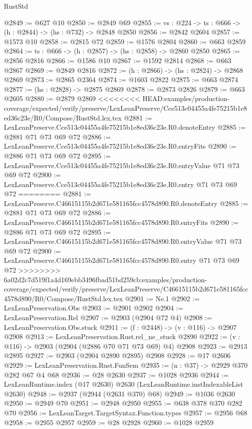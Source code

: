 \begin{lexlean}{RustStd}
\begin{coremodule}
{\begin{coremodule}
{{{{{{{@2849 := @627 @10
@2850 := @2849 @69
@2855 := {vs : @224} -> {ts : @666} -> (h : @2844) -> (hs : @732) -> @2848 @2850
@2856 := @2842 @2604
@2857 := @1573 @10
@2858 := @2815 @72
@2859 := @1576 @2804
@2860 := @663 @2859
@2864 := {ts : @666} -> (h : @2857) -> (hs : @2858) -> @2860 @2850
@2865 := @2856 @2816
@2866 := @1586 @10
@2867 := @1592 @2814
@2868 := @663 @2867
@2869 := @2849 @2816
@2872 := (h : @2866) -> (hs : @2824) -> @2868 @2869
@2873 := @2865 @2364
@2874 := @1603 @2822
@2875 := @663 @2874
@2877 := (hs : @2828) -> @2875 @2869
@2878 := @2873 @2826
@2879 := @663 @2605
@2880 := @2879 @2869
<<<<<<<< HEAD:examples/production-coverage/expected/verify/preserve/LexLeanPreserve/Cce513c04455a4fe75215b1e8ed36c23e/R0/Compose/RustStd.lex.tex
@2881 := LexLeanPreserve.Cce513c04455a4fe75215b1e8ed36c23e.R0.denoteEntry
@2885 := @2881 @71 @73 @69 @72
@2886 := LexLeanPreserve.Cce513c04455a4fe75215b1e8ed36c23e.R0.entryFits
@2890 := @2886 @71 @73 @69 @72
@2895 := LexLeanPreserve.Cce513c04455a4fe75215b1e8ed36c23e.R0.entryValue @71 @73 @69 @72
@2900 := LexLeanPreserve.Cce513c04455a4fe75215b1e8ed36c23e.R0.entry @71 @73 @69 @72
========
@2881 := LexLeanPreserve.C46615115b2d671e581165fcc4578d890.R0.denoteEntry
@2885 := @2881 @71 @73 @69 @72
@2886 := LexLeanPreserve.C46615115b2d671e581165fcc4578d890.R0.entryFits
@2890 := @2886 @71 @73 @69 @72
@2895 := LexLeanPreserve.C46615115b2d671e581165fcc4578d890.R0.entryValue @71 @73 @69 @72
@2900 := LexLeanPreserve.C46615115b2d671e581165fcc4578d890.R0.entry @71 @73 @69 @72
>>>>>>>> 6a02d2c7d519f1a4d169ebb3496fbad51bd259cb:examples/production-coverage/expected/verify/preserve/LexLeanPreserve/C46615115b2d671e581165fcc4578d890/R0/Compose/RustStd.lex.tex
@2901 := Ne.{1}
@2902 := LexLeanPreservation.Obs
@2903 := @2901 @2902
@2904 := LexLeanPreservation.Rel
@2907 := @2903 (@2904 @72 @4)
@2908 := LexLeanPreservation.Obs.stuck
@2911 := (f : @2448) -> (v : @116) -> @2907 @2908
@2913 := LexLeanPreservation.Rust.rel_ne_stuck @2890
@2922 := (v : @116) -> @2903 (@2904 (@2886 @70 @71 @73 @69) @4) @2908
@2923 := @2913 @2895
@2927 := @2903 (@2904 @2890 @2895) @2908
@2928 := @17 @2606
@2929 := LexLeanPreservation.Rust.FunSem
@2935 := (n : @37) -> @2929 @370 @282 @67 @4 @68
@2936 := @28 @2630
@2937 := @1028 @2936
@2944 := LexLeanRuntime.index (@17 @2630) @2630 (LexLeanRuntime.instIndexableList @2630)
@2948 := @2937 (@2944 (@2631 @370) @68)
@2949 := @1036 @2630
@2950 := @2949 @70
@2951 := @2948 @2950
@2955 := @638 @378 @370 @282 @70
@2956 := LexLeanTarget.TargetSyntax.Function.types
@2957 := @2956 @68
@2958 := @2955 @2957
@2959 := @28 @2928
@2960 := @1028 @2959
}}}}}}}
\end{coremodule}}
\end{coremodule}
\end{lexlean}
